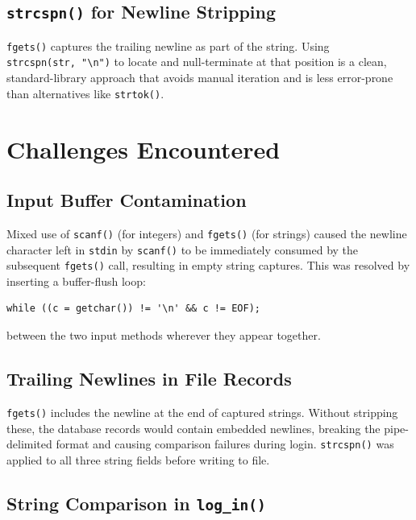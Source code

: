 \documentclass[12pt, a4paper]{article}
\begin{document}
\subsection{\texttt{strcspn()} for Newline Stripping}

\texttt{fgets()} captures the trailing newline as part of the string. Using
\texttt{strcspn(str,~"\textbackslash n")} to locate and null-terminate at that position is a
clean, standard-library approach that avoids manual iteration and is less error-prone than
alternatives like \texttt{strtok()}.

\section{Challenges Encountered}

\subsection{Input Buffer Contamination}

Mixed use of \texttt{scanf()} (for integers) and \texttt{fgets()} (for strings) caused the
newline character left in \texttt{stdin} by \texttt{scanf()} to be immediately consumed by
the subsequent \texttt{fgets()} call, resulting in empty string captures. This was resolved
by inserting a buffer-flush loop:

\begin{lstlisting}[caption={Buffer-flush idiom}]
while ((c = getchar()) != '\n' && c != EOF);
\end{lstlisting}

between the two input methods wherever they appear together.

\subsection{Trailing Newlines in File Records}

\texttt{fgets()} includes the newline at the end of captured strings. Without stripping
these, the database records would contain embedded newlines, breaking the pipe-delimited
format and causing comparison failures during login. \texttt{strcspn()} was applied to all
three string fields before writing to file.

\subsection{String Comparison in \texttt{log\_in()}}
\end{document}
